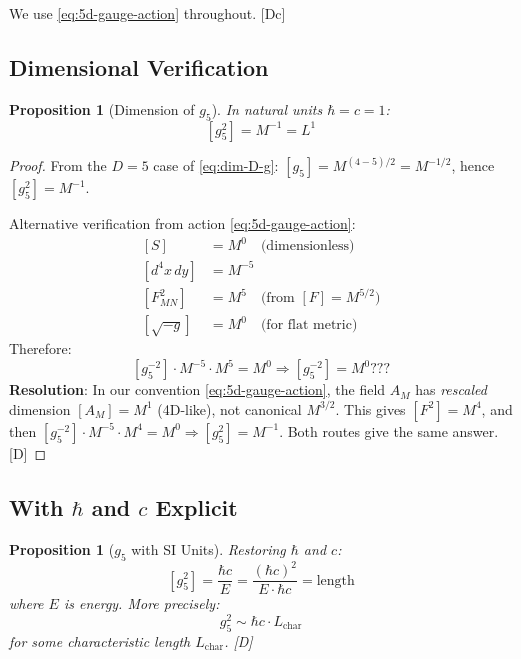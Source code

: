 \documentclass[11pt,a4paper]{article}
\newtheorem{proposition}[theorem]{Proposition}
\newcommand{\tagD}{\textcolor{blue!70!black}{[D]}}
\newcommand{\tagDc}{\textcolor{blue!50!black}{[Dc]}}
\begin{document}
We use \eqref{eq:5d-gauge-action} throughout. \tagDc

\subsection{Dimensional Verification}

\begin{proposition}[Dimension of $g_5$]
\label{prop:dim-g5}
In natural units $\hbar = c = 1$:
\begin{equation}
\label{eq:dim-g5}
[g_5^2] = M^{-1} = L^1
\end{equation}
\end{proposition}

\begin{proof}
From the $D=5$ case of \eqref{eq:dim-D-g}: $[g_5] = M^{(4-5)/2} = M^{-1/2}$, hence $[g_5^2] = M^{-1}$.

Alternative verification from action \eqref{eq:5d-gauge-action}:
\begin{align}
\label{eq:dim-proof-1}
[S] &= M^0 \quad \text{(dimensionless)} \\
\label{eq:dim-proof-2}
[d^4x\, dy] &= M^{-5} \\
\label{eq:dim-proof-3}
[F_{MN}^2] &= M^5 \quad \text{(from } [F] = M^{5/2}\text{)} \\
\label{eq:dim-proof-4}
[\sqrt{-g}] &= M^0 \quad \text{(for flat metric)}
\end{align}
Therefore:
\begin{equation}
\label{eq:dim-proof-5}
[g_5^{-2}] \cdot M^{-5} \cdot M^5 = M^0 \Rightarrow [g_5^{-2}] = M^0???
\end{equation}
\textbf{Resolution}: In our convention \eqref{eq:5d-gauge-action}, the field $A_M$ has
\emph{rescaled} dimension $[A_M] = M^1$ (4D-like), not canonical $M^{3/2}$. This gives
$[F^2] = M^4$, and then $[g_5^{-2}] \cdot M^{-5} \cdot M^4 = M^0 \Rightarrow [g_5^2] = M^{-1}$.
Both routes give the same answer. \tagD
\end{proof}

\subsection{With $\hbar$ and $c$ Explicit}

\begin{proposition}[$g_5$ with SI Units]
\label{prop:g5-si}
Restoring $\hbar$ and $c$:
\begin{equation}
\label{eq:g5-si}
[g_5^2] = \frac{\hbar c}{E} = \frac{(\hbar c)^2}{E \cdot \hbar c} = \text{length}
\end{equation}
where $E$ is energy. More precisely:
\begin{equation}
\label{eq:g5-si-explicit}
g_5^2 \sim \hbar c \cdot L_{\text{char}}
\end{equation}
for some characteristic length $L_{\text{char}}$. \tagD
\end{proposition}
\end{document}
